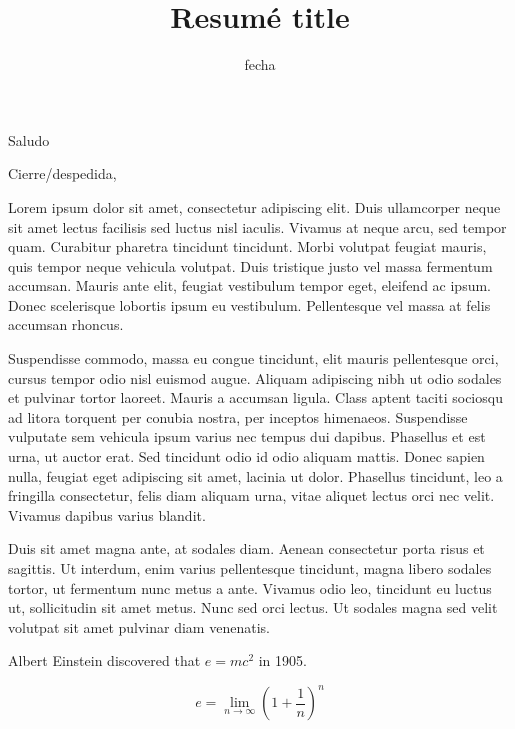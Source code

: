 \documentclass[11pt,a4paper,sans]{moderncv}        %
\title{Resumé title}                               %
\begin{document}
\date{fecha}
\opening{Saludo}
\closing{Cierre/despedida,}
\makelettertitle

Lorem ipsum dolor sit amet, consectetur adipiscing elit. Duis ullamcorper neque sit amet lectus facilisis sed luctus nisl iaculis. Vivamus at neque arcu, sed tempor quam. Curabitur pharetra tincidunt tincidunt. Morbi volutpat feugiat mauris, quis tempor neque vehicula volutpat. Duis tristique justo vel massa fermentum accumsan. Mauris ante elit, feugiat vestibulum tempor eget, eleifend ac ipsum. Donec scelerisque lobortis ipsum eu vestibulum. Pellentesque vel massa at felis accumsan rhoncus.

Suspendisse commodo, massa eu congue tincidunt, elit mauris pellentesque orci, cursus tempor odio nisl euismod augue. Aliquam adipiscing nibh ut odio sodales et pulvinar tortor laoreet. Mauris a accumsan ligula. Class aptent taciti sociosqu ad litora torquent per conubia nostra, per inceptos himenaeos. Suspendisse vulputate sem vehicula ipsum varius nec tempus dui dapibus. Phasellus et est urna, ut auctor erat. Sed tincidunt odio id odio aliquam mattis. Donec sapien nulla, feugiat eget adipiscing sit amet, lacinia ut dolor. Phasellus tincidunt, leo a fringilla consectetur, felis diam aliquam urna, vitae aliquet lectus orci nec velit. Vivamus dapibus varius blandit.

Duis sit amet magna ante, at sodales diam. Aenean consectetur porta risus et sagittis. Ut interdum, enim varius pellentesque tincidunt, magna libero sodales tortor, ut fermentum nunc metus a ante. Vivamus odio leo, tincidunt eu luctus ut, sollicitudin sit amet metus. Nunc sed orci lectus. Ut sodales magna sed velit volutpat sit amet pulvinar diam venenatis.

Albert Einstein discovered that $e=mc^2$ in 1905.

\[ e=\lim_{n \to \infty} \left(1+\frac{1}{n}\right)^n \]

\makeletterclosing
\end{document}
